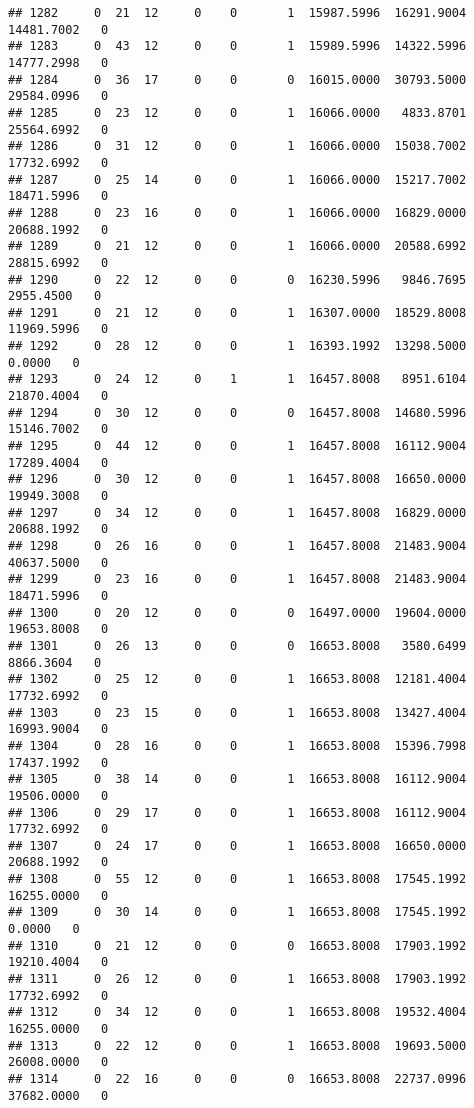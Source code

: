 \documentclass[
]{article}
\begin{document}
\begin{enumerate}
\begin{verbatim}
## 1282     0  21  12     0    0       1  15987.5996  16291.9004  14481.7002   0
## 1283     0  43  12     0    0       1  15989.5996  14322.5996  14777.2998   0
## 1284     0  36  17     0    0       0  16015.0000  30793.5000  29584.0996   0
## 1285     0  23  12     0    0       1  16066.0000   4833.8701  25564.6992   0
## 1286     0  31  12     0    0       1  16066.0000  15038.7002  17732.6992   0
## 1287     0  25  14     0    0       1  16066.0000  15217.7002  18471.5996   0
## 1288     0  23  16     0    0       1  16066.0000  16829.0000  20688.1992   0
## 1289     0  21  12     0    0       1  16066.0000  20588.6992  28815.6992   0
## 1290     0  22  12     0    0       0  16230.5996   9846.7695   2955.4500   0
## 1291     0  21  12     0    0       1  16307.0000  18529.8008  11969.5996   0
## 1292     0  28  12     0    0       1  16393.1992  13298.5000      0.0000   0
## 1293     0  24  12     0    1       1  16457.8008   8951.6104  21870.4004   0
## 1294     0  30  12     0    0       0  16457.8008  14680.5996  15146.7002   0
## 1295     0  44  12     0    0       1  16457.8008  16112.9004  17289.4004   0
## 1296     0  30  12     0    0       1  16457.8008  16650.0000  19949.3008   0
## 1297     0  34  12     0    0       1  16457.8008  16829.0000  20688.1992   0
## 1298     0  26  16     0    0       1  16457.8008  21483.9004  40637.5000   0
## 1299     0  23  16     0    0       1  16457.8008  21483.9004  18471.5996   0
## 1300     0  20  12     0    0       0  16497.0000  19604.0000  19653.8008   0
## 1301     0  26  13     0    0       0  16653.8008   3580.6499   8866.3604   0
## 1302     0  25  12     0    0       1  16653.8008  12181.4004  17732.6992   0
## 1303     0  23  15     0    0       1  16653.8008  13427.4004  16993.9004   0
## 1304     0  28  16     0    0       1  16653.8008  15396.7998  17437.1992   0
## 1305     0  38  14     0    0       1  16653.8008  16112.9004  19506.0000   0
## 1306     0  29  17     0    0       1  16653.8008  16112.9004  17732.6992   0
## 1307     0  24  17     0    0       1  16653.8008  16650.0000  20688.1992   0
## 1308     0  55  12     0    0       1  16653.8008  17545.1992  16255.0000   0
## 1309     0  30  14     0    0       1  16653.8008  17545.1992      0.0000   0
## 1310     0  21  12     0    0       0  16653.8008  17903.1992  19210.4004   0
## 1311     0  26  12     0    0       1  16653.8008  17903.1992  17732.6992   0
## 1312     0  34  12     0    0       1  16653.8008  19532.4004  16255.0000   0
## 1313     0  22  12     0    0       1  16653.8008  19693.5000  26008.0000   0
## 1314     0  22  16     0    0       0  16653.8008  22737.0996  37682.0000   0

\end{verbatim}
\end{enumerate}
\end{document}
